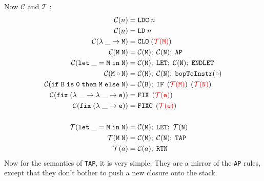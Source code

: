 Now $\mathcal{C}$ and $\mathcal{T}$ \cite{LeroyMPRI}:
\[
\begin{aligned}
    \mathcal{C}(n) &= \mathtt{LDC}\; n \\
    \mathcal{C}(\underline{n}) &= \mathtt{LD}\; n \\
    \mathcal{C}(\mathtt{\lambda\; \_ \to M}) &= \mathtt{CLO}\; (\textcolor{red}{\mathcal{T}(\mathtt{M})}) \\
    \mathcal{C}(\mathtt{M\; N}) &= \mathcal{C}(\mathtt{M});\; \mathcal{C}(\mathtt{N});\; \mathtt{AP} \\
    \mathcal{C}(\mathtt{let\; \_ = M\; in\; N}) & = \mathcal{C}(\mathtt{M});\; \texttt{LET};\; \mathcal{C}(\mathtt{N});\; \texttt{ENDLET} \\
    \mathcal{C}(\mathtt{M \circ N}) &= \mathcal{C}(\mathtt{M});\; \mathcal{C}(\mathtt{N});\; \mathtt{bopToInstr}(\circ) \\
    \mathcal{C}(\mathtt{if\; B\; is\; 0\; then \; M\; else \; N}) &= \mathcal{C}(\mathtt{B});\; \mathtt{IF}\; \left(\textcolor{red}{\mathcal{T}(\mathtt{M})}\right)\; \left(\textcolor{red}{\mathcal{T}(\mathtt{N})}\right) \\
    \mathcal{C}(\mathtt{fix\; (\lambda \ \_ \to \lambda \ \_ \to e)}) &= \mathtt{FIX}\; \left(\textcolor{red}{\mathcal{T}(\mathtt{e})}\right) \\
    \mathcal{C}(\mathtt{fix\; (\lambda \ \_ \to e)}) &= \mathtt{FIXC}\; \left(\textcolor{red}{\mathcal{T}(\mathtt{e})}\right) \\
    \\
    \mathcal{T}(\mathtt{let\; \_ = M\; in\; N}) & = \mathcal{C}(\mathtt{M});\; \texttt{LET};\; \mathcal{T}(\mathtt{N}) \\
    \mathcal{T}(\mathtt{M\; N}) &= \mathcal{C}(\mathtt{M});\; \mathcal{C}(\mathtt{N});\; \mathtt{TAP} \\
    \mathcal{T}(a) &= \mathcal{C}(a);\; \texttt{RTN}
\end{aligned}
\]
Now for the semantics of \texttt{TAP}, it is very simple. They are a mirror of the \texttt{AP} rules, except that they don't bother
to push a new closure onto the stack.

